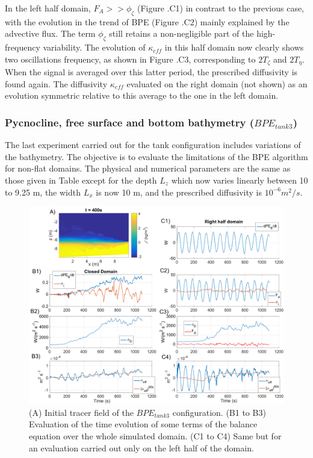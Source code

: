 In the left half domain, $F_A>>\phi_{\zeta}$ (Figure .C1) in contrast to the previous case, with the evolution in the trend of BPE (Figure .C2) mainly explained by the advective flux. The term $\phi_{\zeta}$ still retains a non-negligible part of the high-frequency variability. The evolution of $\kappa_{eff}$ in this half domain now clearly shows two oscillations frequency, as shown in Figure .C3, corresponding to $2T_{\zeta}$ and $2T_{\eta}$. When the signal is averaged over this latter period, the prescribed diffusivity is found again. The diffusivity $\kappa_{eff}$ evaluated on the right domain (not shown) as an evolution symmetric relative to this average to the one in the left domain.

\subsubsection{Pycnocline, free surface and bottom bathymetry ($BPE_{tank3}$)}
The last experiment carried out for the tank configuration includes variations of the bathymetry. The objective is to evaluate the limitations of the BPE algorithm for non-flat domains. The physical and numerical parameters are the same as those given in Table  except for the depth $L_z$ which now varies linearly between 10 to 9.25 m, the width $L_x$ is now 10 m, and the prescribed diffusivity is $10^{-6}m^2/s$.

\begin{figure}[h!]
\includegraphics[width=1.\textwidth]{./CHAP_BPE/Fig_TANK_pycbath2.png}
\caption[Initial tracer field and evaluation of $\kappa_{eff}$ for configuration $BPE_{tank3}$]{(A) Initial tracer field of the $BPE_{tank3}$ configuration. (B1 to B3) Evaluation of the time evolution of some terms of the balance equation  over the whole simulated domain. (C1 to C4) Same but for an evaluation carried out only on the left half of the domain.}
\label{figCbath}
\end{figure}

